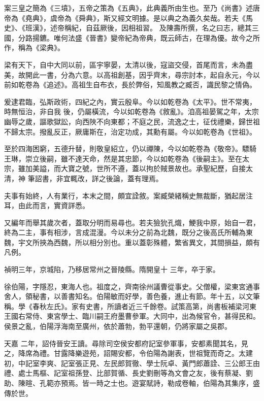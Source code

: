 \begin{pinyinscope}
 案三皇之簡為《三墳》，五帝之策為《五典》，此典義所由生也。至乃《尚書》述唐帝為《堯典》，虞帝為《舜典》，斯又經文明據。是以典之為義久矣哉。若夫《馬史》、《班漢》，述帝稱紀，自茲厥後，因相祖習。
 及陳壽所撰，名之曰志，總其三國，分路揚鑣。唯何法盛《晉書》變帝紀為帝典，既云師古，在理為優。故今之所作，稱為《梁典》。



 梁有天下，自中大同以前，區宇寧晏，太清以後，寇盜交侵，首尾而言，未為盡美，故開此一書，分為六意。以高祖創基，因乎齊末，尋宗討本，起自永元，今以前如乾卷為《追述》。高祖生自布衣，長於弊俗，知風教之臧否，識民黎之情偽。



 爰逮君臨，弘斯政術，四紀之內，實云殷阜。今以如乾卷為《太平》。世不常夷，時無恒治，非自我
 後，仍屬橫流，今以如乾卷為《敘亂》。洎高祖晏駕之年，太宗幽辱之歲，謳歌獄訟，向西陜不向東都；不庭之民，流逸之士，征伐禮樂，歸世祖不歸太宗。撥亂反正，厥庸斯在，治定功成，其勳有屬。今以如乾卷為《世祖》。



 至於四海困窮，五德升替，則敬皇紹立，仍以禪陳，今以如乾卷為《敬帝》。驃騎王琳，崇立後嗣，雖不達天命，然是其忠節，今以如乾卷為《後嗣主》。至在太宗，雖加美謚，而大寶之號，世所不遵，蓋以拘於賊景故也。承聖紀歷，自接太清，神
 筆詔書，非宜輒改，詳之後論，蓋有理焉。



 夫事有始終，人有業行，本末之間，頗宜詮敘。案臧榮緒稱史無裁斷，猶起居注耳，由此而言，實資詳悉。



 又編年而舉其歲次者，蓋取分明而易尋也。若夫獫狁孔熾，鯁我中原，始自一君，終為二主，事有相涉，言成混漫。今以未分之前為北魏，既分之後高氏所輔為東魏，宇文所挾為西魏，所以相分別也。重以蓋彰殊體，繁省異文，其間損益，頗有凡例。



 禎明三年，京城陷，乃移居常州之晉陵縣。隋開皇十
 三年，卒于家。



 徐伯陽，字隱忍，東海人也。祖度之，齊南徐州議曹從事史。父僧權，梁東宮通事舍人，領秘書，以善書知名。伯陽敏而好學，善色養，進止有節。年十五，以文筆稱。學《春秋左氏》。家有史書，所讀者近三千餘卷。試策高第，尚書板補梁河東王國右常侍、東宮學士、臨川嗣王府墨曹參軍。大同中，出為候官令，甚得民和。侯景之亂，伯陽浮海南至廣州，依於蕭勃，勃平還朝，仍將家屬之吳郡。



 天嘉
 二年，詔侍晉安王讀。尋除司空侯安都府記室參軍事，安都素聞其名，見之，降席為禮。甘露降樂遊苑，詔賜安都，令伯陽為謝表，世祖覽而奇之。太建初，中記室李爽、記室張正見、左民郎賀徹、學士阮卓、黃門郎蕭詮、三公郎王由禮、處士馬樞、記室祖孫登、比部賀循、長史劉刪等為文會之友，後有蔡凝、劉助、陳暄、孔範亦預焉。皆一時之士也。遊宴賦詩，勒成卷軸，伯陽為其集序，盛傳於世。




\end{pinyinscope}
